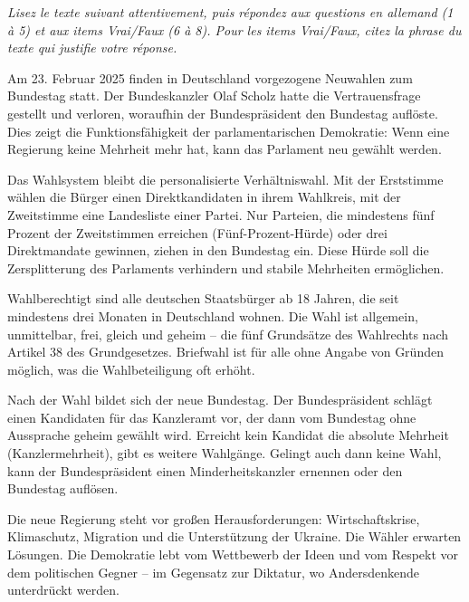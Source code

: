 \documentclass[11pt]{article}
\newcounter{popsec}
\newcounter{popsub}
\newcommand{\courssub}[1]{%
  \stepcounter{popsub}%
  \par\vspace{9pt}\noindent{\popxbold\fontsize{11.5}{13}\selectfont\color{popink}{\color{poporange}\thepopsec.\thepopsub}\hspace{6pt}#1}\par\nopagebreak\vspace{4pt}
}
\begin{document}
\courssub{Je me prépare au Bac}

\begin{exercice}
\emph{Lisez le texte suivant attentivement, puis répondez aux questions en allemand (1 à 5) et aux items Vrai/Faux (6 à 8). Pour les items Vrai/Faux, citez la phrase du texte qui justifie votre réponse.}

\begin{textebox}
Am 23. Februar 2025 finden in Deutschland vorgezogene Neuwahlen zum Bundestag statt. Der Bundeskanzler Olaf Scholz hatte die Vertrauensfrage gestellt und verloren, woraufhin der Bundespräsident den Bundestag auflöste. Dies zeigt die Funktionsfähigkeit der parlamentarischen Demokratie: Wenn eine Regierung keine Mehrheit mehr hat, kann das Parlament neu gewählt werden.

Das Wahlsystem bleibt die personalisierte Verhältniswahl. Mit der Erststimme wählen die Bürger einen Direktkandidaten in ihrem Wahlkreis, mit der Zweitstimme eine Landesliste einer Partei. Nur Parteien, die mindestens fünf Prozent der Zweitstimmen erreichen (Fünf-Prozent-Hürde) oder drei Direktmandate gewinnen, ziehen in den Bundestag ein. Diese Hürde soll die Zersplitterung des Parlaments verhindern und stabile Mehrheiten ermöglichen.

Wahlberechtigt sind alle deutschen Staatsbürger ab 18 Jahren, die seit mindestens drei Monaten in Deutschland wohnen. Die Wahl ist allgemein, unmittelbar, frei, gleich und geheim – die fünf Grundsätze des Wahlrechts nach Artikel 38 des Grundgesetzes. Briefwahl ist für alle ohne Angabe von Gründen möglich, was die Wahlbeteiligung oft erhöht.

Nach der Wahl bildet sich der neue Bundestag. Der Bundespräsident schlägt einen Kandidaten für das Kanzleramt vor, der dann vom Bundestag ohne Aussprache geheim gewählt wird. Erreicht kein Kandidat die absolute Mehrheit (Kanzlermehrheit), gibt es weitere Wahlgänge. Gelingt auch dann keine Wahl, kann der Bundespräsident einen Minderheitskanzler ernennen oder den Bundestag auflösen.

Die neue Regierung steht vor großen Herausforderungen: Wirtschaftskrise, Klimaschutz, Migration und die Unterstützung der Ukraine. Die Wähler erwarten Lösungen. Die Demokratie lebt vom Wettbewerb der Ideen und vom Respekt vor dem politischen Gegner – im Gegensatz zur Diktatur, wo Andersdenkende unterdrückt werden.
\end{textebox}


\end{exercice}
\end{document}

